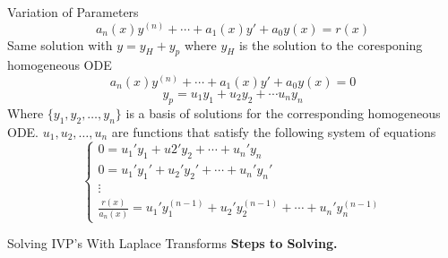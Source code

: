 \documentclass{article}
\begin{document}
\begin{multicols*}{3}
\begin{blackbox}{Variation of Parameters}
        \[a_n(x)y^{(n)} + \cdots + a_1(x)y' + a_0y(x) = r(x)\]
        Same solution with $y = y_H + y_p$ where $y_H$ is the solution to the coresponing homogeneous ODE\\[-1.5ex]
        \[a_n(x)y^{(n)} + \cdots + a_1(x)y' + a_0y(x) = 0\]
        \[y_p = u_1y_1 + u_2y_2 + \cdots u_ny_n\]
        Where $\{y_1,y_2,\ldots,y_n\}$ is a basis of solutions for the corresponding homogeneous ODE. $u_1, u_2, \ldots, u_n$ are functions that satisfy the following system of equations 
        \[\begin{cases}
            0 = u_1'y_1 + u2'y_2 + \cdots + u_n'y_n \\
            0 = u_1'y_1' + u_2'y_2' + \cdots + u_n'y_n' \\
            \vdots\\
            \frac{r(x)}{a_n(x)} = u_1'y_1^{(n-1)} + u_2'y_2^{(n-1)} + \cdots + u_n'y_n ^{(n-1)} 
        \end{cases}\]
\end{blackbox}
\begin{blackbox}{Solving IVP's With Laplace Transforms}
    \textbf{Steps to Solving.}
    {\footnotesize
    
}
\end{blackbox}
\end{multicols*}
\end{document}
